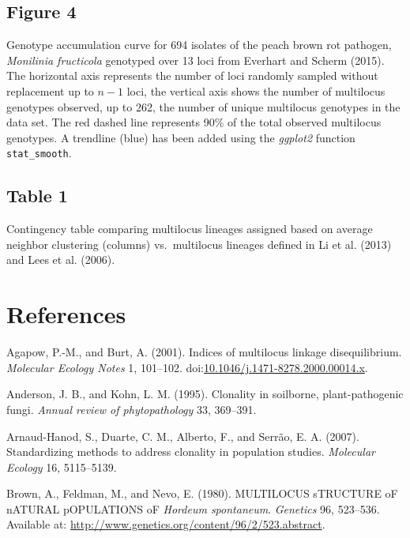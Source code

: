 \documentclass{frontiersSCNS} %
\begin{document}
\subsection*{Figure 4}\label{figure-4-1}

Genotype accumulation curve for 694 isolates of the peach brown rot
pathogen, \emph{Monilinia fructicola} genotyped over 13 loci from
Everhart and Scherm (2015). The horizontal axis represents the number of
loci randomly sampled without replacement up to \(n - 1\) loci, the
vertical axis shows the number of multilocus genotypes observed, up to
262, the number of unique multilocus genotypes in the data set. The red
dashed line represents 90\% of the total observed multilocus genotypes.
A trendline (blue) has been added using the \emph{ggplot2} function
\texttt{stat\_smooth}.

\subsection*{Table 1}\label{table-1-1}

Contingency table comparing multilocus lineages assigned based on
average neighbor clustering (columns) vs.~multilocus lineages defined in
Li et al. (2013) and Lees et al. (2006).

\section*{References}\label{references}

Agapow, P.-M., and Burt, A. (2001). Indices of multilocus linkage
disequilibrium. \emph{Molecular Ecology Notes} 1, 101--102.
doi:\href{http://dx.doi.org/10.1046/j.1471-8278.2000.00014.x}{10.1046/j.1471-8278.2000.00014.x}.

Anderson, J. B., and Kohn, L. M. (1995). Clonality in soilborne,
plant-pathogenic fungi. \emph{Annual review of phytopathology} 33,
369--391.

Arnaud-Hanod, S., Duarte, C. M., Alberto, F., and Serr{ã}o, E. A.
(2007). Standardizing methods to address clonality in population
studies. \emph{Molecular Ecology} 16, 5115--5139.

Brown, A., Feldman, M., and Nevo, E. (1980). MULTILOCUS sTRUCTURE oF
nATURAL pOPULATIONS oF \emph{Hordeum spontaneum}. \emph{Genetics} 96,
523--536. Available at:
\url{http://www.genetics.org/content/96/2/523.abstract}.
\end{document}
